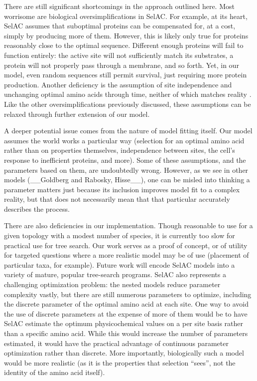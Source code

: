 \documentclass[onecolumn,letterpaper,fleqn,nogrid]{myMBE}%
\newcommand{\PC}{physicochemical\xspace}
\newcommand{\selac}{SelAC\xspace}
\begin{document}
There are still significant shortcomings in the approach outlined here.
Most worrisome are biological oversimplifications in \selac.
For example, at its heart, \selac assumes that suboptimal proteins can be compensated for, at a cost, simply by producing more of them.
However, this is likely only true for proteins reasonably close to the optimal sequence.
Different enough proteins will fail to function entirely: the active site will not sufficiently match its substrates, a protein will not properly pass through a membrane, and so forth.
Yet, in our model, even random sequences still permit survival, just requiring more protein production.
Another deficiency is the assumption of site independence and unchanging optimal amino acids through time, neither of which matches reality \citep{ShahEtAl2015,PollockEtAl2012}.
Like the other oversimplifications previously discussed, these assumptions can be relaxed through further extension of our model.

A deeper potential issue comes from the nature of model fitting itself.
Our model assumes the world works a particular way (selection for an optimal amino acid rather than on properties themselves, independence between sites, the cell's response to inefficient proteins, and more).
Some of these assumptions, and the parameters based on them, are undoubtedly wrong.
However, as we see in other models (\_\_Goldberg and Rabosky, Hisse\_\_), one can be misled into thinking a parameter matters just because its inclusion improves model fit to a complex reality, but that does not necessarily mean that that particular accurately describes the process. %



There are also deficiencies in our implementation.
Though reasonable to use for a given topology with a modest number of species, it is currently too slow for practical use for tree search.
Our work serves as a proof of concept, or of utility for targeted questions where a more realistic model may be of use (placement of particular taxa, for example).
Future work will encode \selac models into a variety of mature, popular tree-search programs.
\selac also represents a challenging optimization problem: the nested models reduce parameter complexity vastly, but there are still numerous parameters to optimize, including the discrete parameter of the optimal amino acid at each site.
One way to avoid the use of discrete parameters at the expense of more of them would be to have \selac estimate the optimum \PC values on a per site basis rather than a specific amino acid.
While this would increase the number of parameters estimated, it would have the practical advantage of continuous parameter optimization rather than discrete.
More importantly, biologically such a model would be more realistic (as it is the properties that selection ``sees'', not the identity of the amino acid itself).
\end{document}

